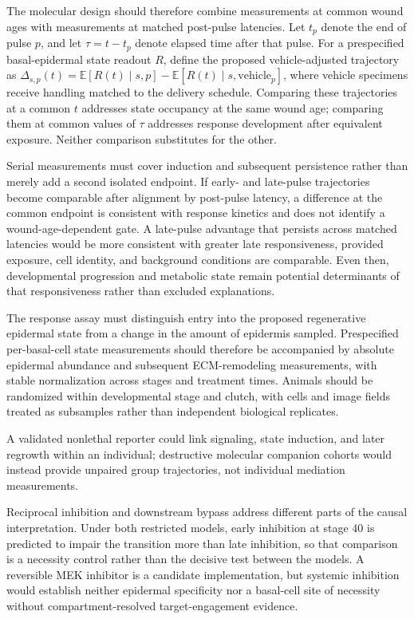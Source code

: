 \documentclass[11pt]{article}
\begin{document}
The molecular design should therefore combine measurements at common wound ages with measurements at matched post-pulse latencies. Let $t_p$ denote the end of pulse $p$, and let $\tau=t-t_p$ denote elapsed time after that pulse. For a prespecified basal-epidermal state readout $R$, define the proposed vehicle-adjusted trajectory as $\Delta_{s,p}(t)=\mathbb{E}[R(t)\mid s,p]-\mathbb{E}[R(t)\mid s,\mathrm{vehicle}_p]$, where vehicle specimens receive handling matched to the delivery schedule. Comparing these trajectories at a common $t$ addresses state occupancy at the same wound age; comparing them at common values of $\tau$ addresses response development after equivalent exposure. Neither comparison substitutes for the other.

Serial measurements must cover induction and subsequent persistence rather than merely add a second isolated endpoint. If early- and late-pulse trajectories become comparable after alignment by post-pulse latency, a difference at the common endpoint is consistent with response kinetics and does not identify a wound-age-dependent gate. A late-pulse advantage that persists across matched latencies would be more consistent with greater late responsiveness, provided exposure, cell identity, and background conditions are comparable. Even then, developmental progression and metabolic state remain potential determinants of that responsiveness rather than excluded explanations.

The response assay must distinguish entry into the proposed regenerative epidermal state from a change in the amount of epidermis sampled. Prespecified per-basal-cell state measurements should therefore be accompanied by absolute epidermal abundance and subsequent ECM-remodeling measurements, with stable normalization across stages and treatment times. Animals should be randomized within developmental stage and clutch, with cells and image fields treated as subsamples rather than independent biological replicates.

A validated nonlethal reporter could link signaling, state induction, and later regrowth within an individual; destructive molecular companion cohorts would instead provide unpaired group trajectories, not individual mediation measurements.

Reciprocal inhibition and downstream bypass address different parts of the causal interpretation. Under both restricted models, early inhibition at stage $40$ is predicted to impair the transition more than late inhibition, so that comparison is a necessity control rather than the decisive test between the models. A reversible MEK inhibitor is a candidate implementation, but systemic inhibition would establish neither epidermal specificity nor a basal-cell site of necessity without compartment-resolved target-engagement evidence.
\end{document}
